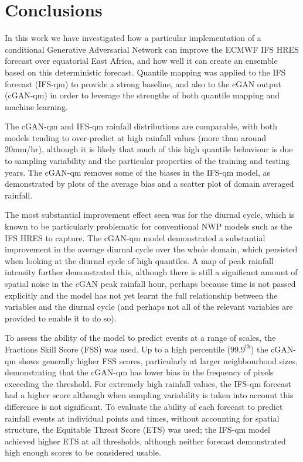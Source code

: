 \documentclass{article}
\begin{document}


\section{ Conclusions}


In this work we have investigated how a particular implementation of a conditional Generative Adversarial Network can improve the ECMWF IFS HRES forecast over equatorial East Africa, and how well it can create an ensemble based on this deterministic forecast. Quantile mapping was applied to the IFS forecast (IFS-qm) to provide a strong baseline, and also to the cGAN output (cGAN-qm) in order to leverage the strengths of both quantile mapping and machine learning.


The cGAN-qm and IFS-qm rainfall distributions are comparable, with both models tending to over-predict at high rainfall values (more than around 20mm/hr), although it is likely that much of this high quantile behaviour is due to sampling variability and the particular properties of the training and testing years. The cGAN-qm removes some of the biases in the IFS-qm model, as demonstrated by plots of the average bias and a scatter plot of domain averaged rainfall.

The most substantial improvement effect seen was for the diurnal cycle, which is known to be particularly problematic for conventional NWP models such as the IFS HRES to capture. The cGAN-qm model demonstrated a substantial improvement in the average diurnal cycle over the whole domain, which persisted when looking at the diurnal cycle of high quantiles. A map of peak rainfall intensity further demonstrated this, although there is still a significant amount of spatial noise in the cGAN peak rainfall hour, perhaps because time is not passed explicitly and the model has not yet learnt the full relationship between the variables and the diurnal cycle (and perhaps not all of the relevant variables are provided to enable it to do so).

To assess the ability of the model to predict events at a range of scales, the Fractions Skill Score (FSS) was used. Up to a high percentile ($99.9^{\text{th}}$) the cGAN-qm shows generally higher FSS scores, particularly at larger neighbourhood sizes, demonstrating that the cGAN-qm has lower bias in the frequency of pixels exceeding the threshold. For extremely high rainfall values, the IFS-qm forecast had a higher score although when sampling variability is taken into account this difference is not significant. To evaluate the ability of each forecast to predict rainfall events at individual points and times, without accounting for spatial structure, the Equitable Threat Score (ETS) was used; the IFS-qm model achieved higher ETS at all thresholds, although neither forecast demonstrated high enough scores to be considered usable.
\end{document}
